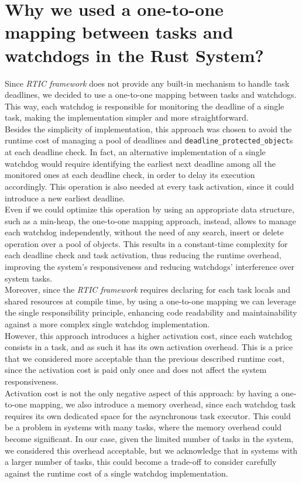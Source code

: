 \documentclass[sigconf, screen]{acmart}
\begin{document}
\section{Why we used a one-to-one mapping between tasks and watchdogs in the Rust System?}
Since \textit{RTIC framework} does not provide any built-in mechanism to 
handle task deadlines, we decided to use a one-to-one mapping between
tasks and watchdogs. This way, each watchdog is responsible for monitoring
the deadline of a single task, making the implementation simpler and more
straightforward. \\
Besides the simplicity of implementation, this approach was chosen to avoid the 
runtime cost of managing a pool of deadlines and 
\texttt{deadline\_protected\_object}s at each deadline check.  
In fact, an alternative implementation of a single watchdog would require
identifying the earliest next deadline among all the monitored ones at each
deadline check, in order to delay its execution accordingly. 
This operation is also needed at every task activation, since it could introduce
a new earliest deadline. \\ 
Even if we could optimize this operation by using an appropriate data structure,
such as a min-heap, the one-to-one mapping approach, instead, allows to manage
each watchdog independently, without the need of any search, insert or
delete operation over a pool of objects. This results in a constant-time
complexity for each deadline check and task activation, thus reducing
the runtime overhead, improving the system's responsiveness and reducing
watchdogs' interference over system tasks. \\
Moreover, since the \textit{RTIC framework} requires declaring for each task
locals and shared resources at compile time, by using a one-to-one mapping we
can leverage the single responsibility principle, enhancing code readability and
maintainability against a more complex single watchdog implementation. \\
However, this approach introduces a higher activation cost, since each watchdog
consists in a task, and as such it has its own activation overhead. This is a
price that we considered more acceptable than the previous described runtime
cost, since the activation cost is paid only once and does not affect the system 
responsiveness. \\
Activation cost is not the only negative aspect of this approach: by having a
one-to-one mapping, we also introduce a memory overhead, since each watchdog
task requires its own dedicated space for the asynchronous task executor. This
could be a problem in systems with many tasks, where the memory overhead could
become significant. In our case, given the limited number of tasks in the
system, we considered this overhead acceptable, but we acknowledge that in
systems with a larger number of tasks, this could become a trade-off to consider
carefully against the runtime cost of a single watchdog implementation.
\end{document}
